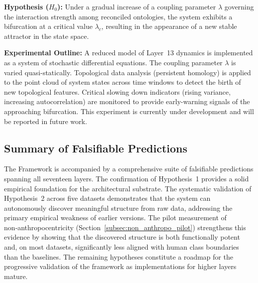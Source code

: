 \textbf{Hypothesis ($H_0$):} Under a gradual increase of a coupling parameter $\lambda$ governing the interaction strength among reconciled ontologies, the system exhibits a bifurcation at a critical value $\lambda_c$, resulting in the appearance of a new stable attractor in the state space.

\textbf{Experimental Outline:} A reduced model of Layer~13 dynamics is implemented as a system of stochastic differential equations. The coupling parameter $\lambda$ is varied quasi-statically. Topological data analysis (persistent homology) is applied to the point cloud of system states across time windows to detect the birth of new topological features. Critical slowing down indicators (rising variance, increasing autocorrelation) are monitored to provide early-warning signals of the approaching bifurcation. This experiment is currently under development and will be reported in future work.

\subsection{Summary of Falsifiable Predictions}
\label{subsec:validation_summary}

The \Apeiron{} Framework is accompanied by a comprehensive suite of
falsifiable predictions spanning all seventeen layers.  The
confirmation of Hypothesis~1 provides a solid empirical foundation for
the architectural substrate.  The systematic validation of
Hypothesis~2 across five datasets demonstrates that the system can
autonomously discover meaningful structure from raw data, addressing
the primary empirical weakness of earlier versions.  The
pilot measurement of non‑anthropocentricity (Section~\ref{subsec:non_anthropo_pilot})
strengthens this evidence by showing that the discovered structure is
both functionally potent and, on most datasets, significantly less
aligned with human class boundaries than the baselines.  The remaining
hypotheses constitute a roadmap for the progressive validation of the
framework as implementations for higher layers mature.
